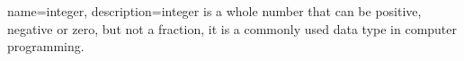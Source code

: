 {
    name=integer,
    description={integer is a whole number that can be positive, negative or zero, but not a fraction, it is a commonly used data type in computer programming.}
}
